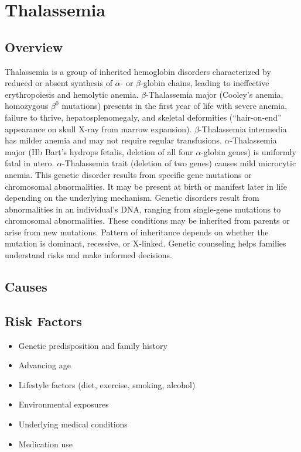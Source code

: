 \chapter{Thalassemia}
\label{sec:Thalassemia}

\section{Overview}
Thalassemia is a group of inherited hemoglobin disorders characterized by reduced or absent synthesis of $\alpha$- or $\beta$-globin chains, leading to ineffective erythropoiesis and hemolytic anemia. $\beta$-Thalassemia major (Cooley's anemia, homozygous $\beta^0$ mutations) presents in the first year of life with severe anemia, failure to thrive, hepatosplenomegaly, and skeletal deformities (``hair-on-end'' appearance on skull X-ray from marrow expansion). $\beta$-Thalassemia intermedia has milder anemia and may not require regular transfusions. $\alpha$-Thalassemia major (Hb Bart's hydrops fetalis, deletion of all four $\alpha$-globin genes) is uniformly fatal in utero. $\alpha$-Thalassemia trait (deletion of two genes) causes mild microcytic anemia. This genetic disorder results from specific gene mutations or chromosomal abnormalities. It may be present at birth or manifest later in life depending on the underlying mechanism. Genetic disorders result from abnormalities in an individual's DNA, ranging from single-gene mutations to chromosomal abnormalities. These conditions may be inherited from parents or arise from new mutations. Pattern of inheritance depends on whether the mutation is dominant, recessive, or X-linked. Genetic counseling helps families understand risks and make informed decisions.
\section{Causes}
\section{Risk Factors}

\begin{itemize}[noitemsep]
  \item Genetic predisposition and family history
  \item Advancing age
  \item Lifestyle factors (diet, exercise, smoking, alcohol)
  \item Environmental exposures
  \item Underlying medical conditions
  \item Medication use
\end{itemize}
